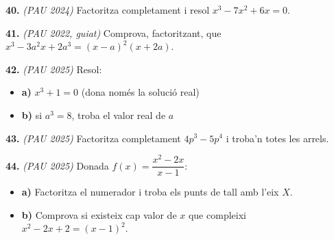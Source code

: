 \documentclass[13pt,a4paper]{extarticle}
\begin{document}
\par\noindent\begin{minipage}{\linewidth}
\textbf{40.} \emph{(PAU 2024)} Factoritza completament i resol $x^3-7x^2+6x=0$.\par
\end{minipage}\par\vspace{1.6mm}
\par\noindent\begin{minipage}{\linewidth}
\textbf{41.} \emph{(PAU 2022, guiat)} Comprova, factoritzant, que $x^3-3a^2x+2a^3=(x-a)^2(x+2a)$.\par
\end{minipage}\par\vspace{1.6mm}
\par\noindent\begin{minipage}{\linewidth}
\textbf{42.} \emph{(PAU 2025)} Resol:\par

\begin{itemize}[leftmargin=0pt,itemsep=3pt,topsep=3pt,parsep=0pt,label={}]
\item \textbf{a)} $x^3+1=0$ (dona només la solució real)
\item \textbf{b)} si $a^3=8$, troba el valor real de $a$
\end{itemize}
\end{minipage}\par\vspace{1.6mm}
\par\noindent\begin{minipage}{\linewidth}
\textbf{43.} \emph{(PAU 2025)} Factoritza completament $4p^3-5p^4$ i troba'n totes les arrels.\par
\end{minipage}\par\vspace{1.6mm}
\par\noindent\begin{minipage}{\linewidth}
\textbf{44.} \emph{(PAU 2025)} Donada $f(x)=\dfrac{x^2-2x}{x-1}$:\par

\begin{itemize}[leftmargin=0pt,itemsep=3pt,topsep=3pt,parsep=0pt,label={}]
\item \textbf{a)} Factoritza el numerador i troba els punts de tall amb l'eix $X$.
\item \textbf{b)} Comprova si existeix cap valor de $x$ que compleixi $x^2-2x+2=(x-1)^2$.
\end{itemize}
\end{minipage}\par\vspace{1.6mm}
\end{document}

